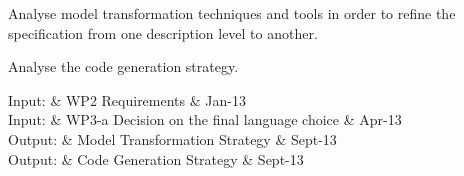 \documentclass{template/openetcs_article}
\begin{document}
Analyse model transformation techniques and tools in order to refine the specification from one description level to another.



Analyse the code generation strategy.



%

\begin{inoutput}
Input: & WP2 Requirements & Jan-13 \\
Input: & WP3-a  Decision on the final language choice & Apr-13 \\
\hline
Output: & Model Transformation Strategy & Sept-13 \\
Output: & Code Generation Strategy & Sept-13 \\
\end{inoutput}
\end{document}
